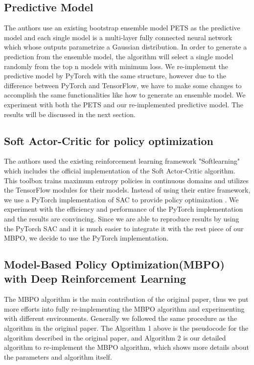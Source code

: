 \documentclass{article}
\begin{document}
\subsection{Predictive Model}
The authors use an existing bootstrap ensemble model PETS as the predictive model and each single model is a multi-layer fully connected neural network which whose outputs parametrize a Gaussian distribution. In order to generate a prediction from the ensemble model, the algorithm will select a single model randomly from the top n models with minimum loss. We re-implement the predictive model by PyTorch with the same structure, however due to the difference between PyTorch and TensorFlow, we have to make some changes to accomplish the same functionalities like how to generate an ensemble model. We experiment with both the PETS and our re-implemented predictive model. The results will be discussed in the next section.

\subsection{Soft Actor-Critic for policy optimization}
The authors used the existing reinforcement learning framework "Softlearning" which includes the official implementation of the Soft Actor-Critic algorithm. This toolbox trains maximum entropy policies in continuous domains and utilizes the TensorFlow modules for their models. Instead of using their entire framework, we use a PyTorch implementation of SAC to provide policy optimization \cite{ref9}. We experiment with the efficiency and performance of the PyTorch implementation and the results are convincing. Since we are able to reproduce results by using the PyTorch SAC and it is much easier to integrate it with the rest piece of our MBPO, we decide to use the PyTorch implementation.

\subsection{Model-Based Policy Optimization(MBPO) with Deep Reinforcement Learning}

The MBPO algorithm is the main contribution of the original paper, thus we put more efforts into fully re-implementing the MBPO algorithm and experimenting with different environments. Generally we followed the same procedure as the algorithm in the original paper. The Algorithm 1 above is the pseudocode for the algorithm described in the original paper, and Algorithm 2 is our detailed algorithm to re-implement the MBPO algorithm, which shows more details about the parameters and algorithm itself. 
\end{document}
